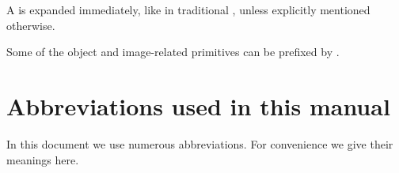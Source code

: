 \documentclass{pdftexmanual}
\begin{document}
{


\endgroup %

\medskip

A  is expanded immediately, like 
in traditional \TEX, unless explicitly mentioned otherwise.

Some of the object and image-related primitives can be prefixed by
.

\chapter{Abbreviations used in this manual}

In this document we use numerous abbreviations. For convenience we give
their meanings here.

\abbrevlist

\twocolumn {\small \emergencystretch=1.5em  }
\end{document}
